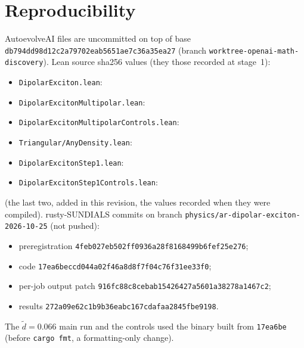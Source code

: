 \documentclass[11pt]{article}
\theoremstyle{remark}
\newcommand{\dt}{\tilde d}
\begin{document}
\section{Reproducibility}\label{sec:repro}
AutoevolveAI files are uncommitted on top of base \texttt{db794dd98d12c2a79702eab5651ae7c36a35ea27} (branch
\texttt{worktree-openai-math-discovery}). Lean source sha256 values (they \DXShaMatch{} those recorded at stage~1):
\begin{itemize}\scriptsize
\item \texttt{DipolarExciton.lean}: \texttt{\DXShaPrior}
\item \texttt{DipolarExcitonMultipolar.lean}: \texttt{\DXShaMulti}
\item \texttt{DipolarExcitonMultipolarControls.lean}: \texttt{\DXShaCtl}
\item \texttt{Triangular/AnyDensity.lean}: \texttt{\DXShaAnyD}
\item \texttt{DipolarExcitonStep1.lean}: \texttt{\DXShaStepOne}
\item \texttt{DipolarExcitonStep1Controls.lean}: \texttt{\DXShaStepOneCtl}
\end{itemize}
(the last two, added in this revision, \DXShaStepOneMatch{} the values recorded when they were compiled).
rusty-SUNDIALS commits on branch \texttt{physics/ar-dipolar-exciton-2026-10-25} (not pushed):
\begin{itemize}\small
\item preregistration \texttt{4feb027eb502ff0936a28f8168499b6fef25e276};
\item code \texttt{17ea6beccd044a02f46a8d8f7f04c76f31ee33f0};
\item per-job output patch \texttt{916fc88c8cebab15426427a5601a38278a1467c2};
\item results \texttt{272a09e62c1b9b36eabc167cdafaa2845fbe9198}.
\end{itemize}
The $\dt=0.066$ main run and the controls used the binary built from \texttt{17ea6be} (before \texttt{cargo fmt}, a
formatting-only change).
\end{document}
